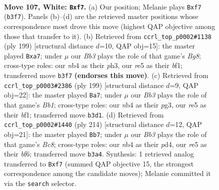 \documentclass[11pt]{article}
\begin{document}
\clearpage

\begin{figure}[p]\centering
\begin{subfigure}{0.46\textwidth}\centering
\resizebox{\linewidth}{!}{%
\newchessgame
\chessboard[
  setfen={5k2/5p2/6p1/4r3/1n6/1B4K1/8/8 w - - 0 107},
  showmover=false,
  pgfstyle=straightmove, color=movearrow, markmove={b3-f7}
]}
\caption{}
\end{subfigure}\hfill
\begin{subfigure}{0.46\textwidth}\centering
\resizebox{\linewidth}{!}{%
\newchessgame
\chessboard[
  setfen={8/PK4k1/8/8/8/7P/8/5Bb1 b - - 0 100},
  showmover=false,
  pgfstyle=straightmove, color=movearrow, markmove={g1-a7}
]}
\caption{}
\end{subfigure}
\\[4pt]
\begin{subfigure}{0.46\textwidth}\centering
\resizebox{\linewidth}{!}{%
\newchessgame
\chessboard[
  setfen={1b6/6k1/8/8/5P2/5KP1/8/5B2 b - - 12 100},
  showmover=false,
  pgfstyle=straightmove, color=movearrow, markmove={b8-a7}
]}
\caption{}
\end{subfigure}\hfill
\begin{subfigure}{0.46\textwidth}\centering
\resizebox{\linewidth}{!}{%
\newchessgame
\chessboard[
  setfen={2B5/8/5b2/8/3p1kp1/8/4K3/8 w - - 8 108},
  showmover=false,
  pgfstyle=straightmove, color=movearrow, markmove={c8-b7}
]}
\caption{}
\end{subfigure}
\caption{\textbf{Move 107, White: \texttt{Bxf7}.} (a) Our position; Melanie plays \texttt{Bxf7} (\texttt{b3f7}). Panels (b)--(d) are the retrieved master positions whose correspondence most drove this move (highest QAP objective among those that transfer to it). (b) Retrieved from \texttt{ccrl\_top\_p0002\#1138} (ply 199) [structural distance $d$=10, QAP obj=15]: the master played \texttt{Bxa7}; under $\mu$ our \emph{Bb3} plays the role of that game's \emph{Bg8}; cross-type roles: our \emph{n}b4 as their \emph{p}h3, our \emph{r}e5 as their \emph{b}f1; transferred move \texttt{b3f7} \textbf{(endorses this move)}. (c) Retrieved from \texttt{ccrl\_top\_p0003\#2386} (ply 199) [structural distance $d$=9, QAP obj=22]: the master played \texttt{Ba7}; under $\mu$ our \emph{Bb3} plays the role of that game's \emph{Bb1}; cross-type roles: our \emph{n}b4 as their \emph{p}g3, our \emph{r}e5 as their \emph{b}f1; transferred move \texttt{b3d1}. (d) Retrieved from \texttt{ccrl\_top\_p0002\#1440} (ply 214) [structural distance $d$=12, QAP obj=21]: the master played \texttt{Bb7}; under $\mu$ our \emph{Bb3} plays the role of that game's \emph{Bc8}; cross-type roles: our \emph{n}b4 as their \emph{p}d4, our \emph{r}e5 as their \emph{b}f6; transferred move \texttt{b3a4}. Synthesis: 1 retrieved analog transferred to \texttt{Bxf7} (summed QAP objective 15, the strongest correspondence among the candidate moves); Melanie committed it via the \texttt{search} selector.}
\label{fig:thought-m212}
\end{figure}
\end{document}
